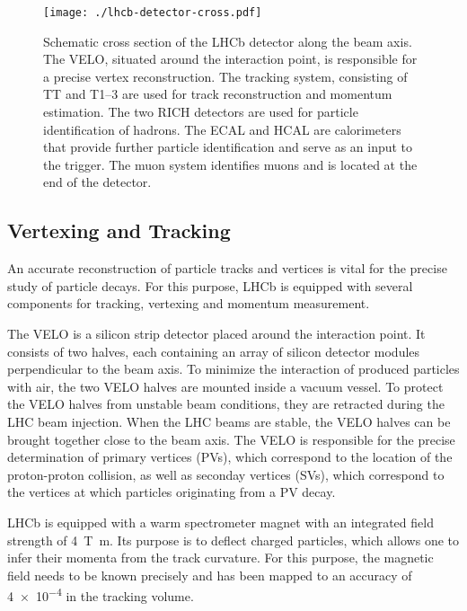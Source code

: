 \begin{figure}
\centering
\texttt{[image: ./lhcb-detector-cross.pdf]}
\caption{
  Schematic cross section of the LHCb detector along the beam axis.
  The \acrshort{VELO}, situated around the interaction point, is responsible for a precise vertex reconstruction.
  The tracking system, consisting of TT and T1--3 are used for track reconstruction and momentum estimation.
  The two RICH detectors are used for particle identification of hadrons.
  The ECAL and HCAL are calorimeters that provide further particle identification and serve as an input to the trigger.
  The muon system identifies muons and is located at the end of the detector.\cite{LHCb2008}
}
\label{fig:lhcbdetector}
\end{figure}


\subsection{Vertexing and Tracking}

An accurate reconstruction of particle tracks and vertices is vital for the precise study of particle decays.
For this purpose, LHCb is equipped with several components for tracking, vertexing and momentum measurement.

The \gls{VELO} is a silicon strip detector placed around the interaction point.
It consists of two halves, each containing an array of silicon detector modules perpendicular to the beam axis.
To minimize the interaction of produced particles with air, the two \gls{VELO} halves are mounted inside a vacuum vessel.
To protect the \gls{VELO} halves from unstable beam conditions, they are retracted during the LHC beam injection.
When the LHC beams are stable, the \gls{VELO} halves can be brought together close to the beam axis.
The \gls{VELO} is responsible for the precise determination of primary vertices (PVs), which correspond to the location of the proton-proton collision, as well as seconday vertices (SVs), which correspond to the vertices at which particles originating from a PV decay.

LHCb is equipped with a warm spectrometer magnet with an integrated field strength of \SI{4}{\tesla\metre}.
Its purpose is to deflect charged particles, which allows one to infer their momenta from the track curvature.
For this purpose, the magnetic field needs to be known precisely and has been mapped to an accuracy of \num{4e-4} in the tracking volume.

